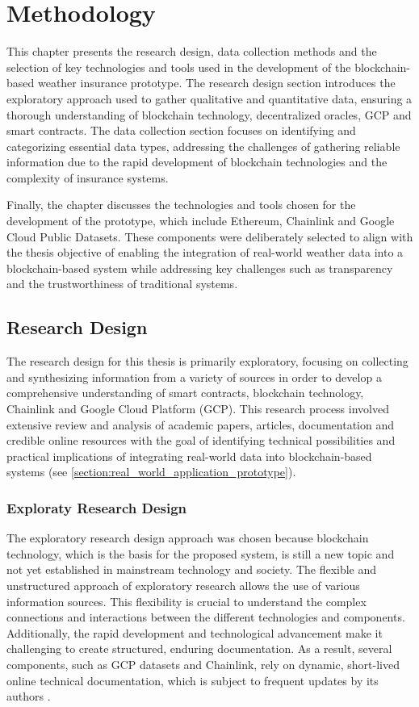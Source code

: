 \chapter{Methodology}\label{chapter:methodology}
This chapter presents the research design, data collection methods and the selection of key technologies and tools used in the development of the blockchain-based weather insurance prototype. The research design section introduces the exploratory approach used to gather qualitative and quantitative data, ensuring a thorough understanding of blockchain technology, decentralized oracles, GCP and smart contracts. The data collection section focuses on identifying and categorizing essential data types, addressing the challenges of gathering reliable information due to the rapid development of blockchain technologies and the complexity of insurance systems.

Finally, the chapter discusses the technologies and tools chosen for the development of the prototype, which include Ethereum, Chainlink and Google Cloud Public Datasets. These components were deliberately selected to align with the thesis objective of enabling the integration of real-world weather data into a blockchain-based system while addressing key challenges such as transparency and the trustworthiness of traditional systems.

\section{Research Design}\label{section:research_design}
The research design for this thesis is primarily exploratory, focusing on collecting and synthesizing information from a variety of sources in order to develop a comprehensive understanding of smart contracts, blockchain technology, Chainlink and Google Cloud Platform (GCP). This research process involved extensive review and analysis of academic papers, articles, documentation and credible online resources with the goal of identifying technical possibilities and practical implications of integrating real-world data into blockchain-based systems (see \cref{section:real_world_application_prototype}).

\subsection{Exploraty Research Design}
The exploratory research design approach was chosen because blockchain technology, which is the basis for the proposed system, is still a new topic and not yet established in mainstream technology and society. The flexible and unstructured approach of exploratory research allows the use of various information sources. This flexibility is crucial to understand the complex connections and interactions between the different technologies and components. Additionally, the rapid development and technological advancement make it challenging to create structured, enduring documentation. As a result, several components, such as GCP datasets and Chainlink, rely on dynamic, short-lived online technical documentation, which is subject to frequent updates by its authors \autocite{kicsi2022exploratory}.

